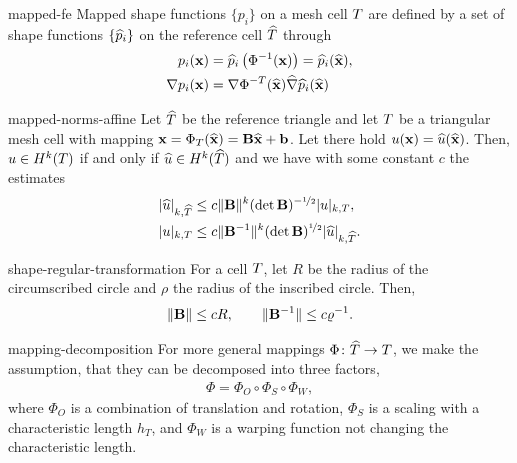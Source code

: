 \begin{Definition}{mapped-fe}
  Mapped shape functions $\{p_i\}$ on a mesh cell $T$ are defined by a
  set of shape functions $\{\widehat{p}_i\}$ on the reference cell
  $\widehat{T}$ through 
  \begin{gather}
    \begin{split}
      p_i(\mathbf x) &= \widehat{p}_i\left(\Phi^{-1}(\mathbf x)\right) = \widehat{p}_i(\widehat{\mathbf x}),\\
      \nabla p_i(\mathbf x) &= \nabla\Phi^{-T}(\widehat{\mathbf x})\widehat{\nabla}\widehat{p}_i(\widehat{\mathbf x})
    \end{split}
  \end{gather}
\end{Definition}

\begin{Lemma}{mapped-norms-affine}
  Let $\widehat{T}$ be the reference triangle and let $T$ be a
  triangular mesh cell with mapping
  $\mathbf x = \Phi_T(\widehat{\mathbf x}) = \mathbf B \widehat{\mathbf x} + \mathbf b$. Let there hold
  $u(\mathbf x) = \widehat{u}(\widehat{\mathbf x})$. Then, $u\in H^k(T)$ if and only if
  $\widehat{u}\in H^k(\widehat{T})$ and we have with some constant $c$ the
  estimates
  \begin{gather}
    \begin{split}
      \lvert\widehat{u}\rvert_{k,\widehat{T}}
      &\le c \lVert\mathbf B\rVert^k (\det \mathbf B)^{-\nicefrac12}
      \lvert u\rvert_{k,T},\\
      \lvert u\rvert_{k,T}
      &\le c \lVert\mathbf B^{-1}\rVert^k (\det \mathbf B)^{\nicefrac12}
      \lvert\widehat{u}\rvert_{k,\widehat{T}}.
    \end{split}
  \end{gather}
\end{Lemma}

\begin{Lemma}{shape-regular-transformation}
  For a cell $T$, let $R$ be the radius of the circumscribed
  circle and $\rho$ the radius of the inscribed circle. Then,
  \begin{gather}
    \lVert\mathbf B\rVert \le c R, \qquad \lVert\mathbf B^{-1}\rVert \le c \varrho^{-1}.
  \end{gather}
\end{Lemma}

\begin{Assumption}{mapping-decomposition}
  For more general mappings $\Phi\colon \widehat{T}\to T$, we
  make the assumption, that they can be decomposed into three factors,
  \begin{gather}
    \Phi = \Phi_O \circ \Phi_S \circ \Phi_W,
  \end{gather}
  where $\Phi_O$ is a combination of translation and rotation,
  $\Phi_S$ is a scaling with a characteristic length $h_T$, and
  $\Phi_W$ is a warping function not changing the characteristic length.
\end{Assumption}

